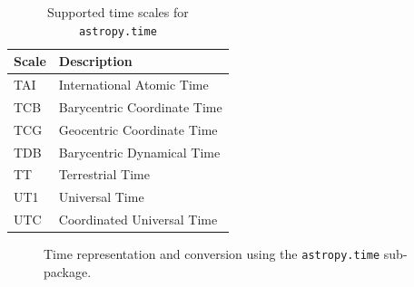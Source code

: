 \documentclass[traditabstract]{aa}
\begin{document}
\begin{table}
\caption{Supported time scales for \texttt{astropy.time}\label{tab:time_systems}}
\center
\begin{tabular}{ll}
\hline
Scale  & Description \\
\hline
TAI    & International Atomic Time \\
TCB    & Barycentric Coordinate Time \\
TCG    & Geocentric Coordinate Time \\
TDB    & Barycentric Dynamical Time \\
TT     & Terrestrial Time \\
UT1    & Universal Time \\
UTC    & Coordinated Universal Time \\
\hline
\end{tabular}
\end{table}

\begin{figure}
\center
\caption{Time representation and conversion using the \texttt{astropy.time}
sub-package.\label{code:time}}
\vspace{0.1in}
\end{figure}
\end{document}
